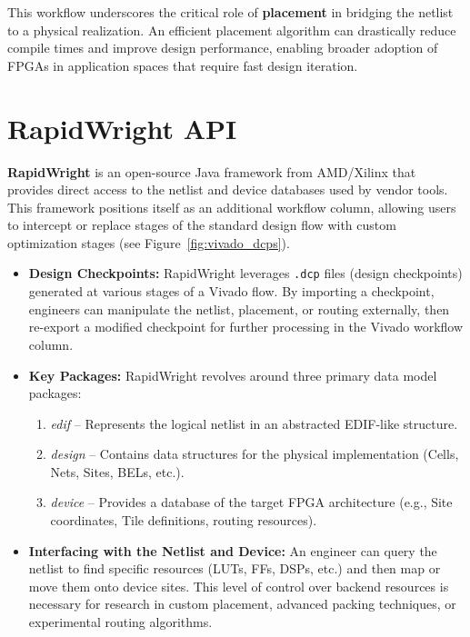 \documentclass{article}
\begin{document}
\begin{multicols}{2}
\begin{enumerate}
    \end{enumerate}

    This workflow underscores the critical role of \textbf{placement} in bridging the netlist to a physical realization. 
    An efficient placement algorithm can drastically reduce compile times and improve design performance, enabling broader adoption of FPGAs in application spaces that require fast design iteration.

\newpage
\section{RapidWright API}
    \label{sec:rapidwright_api}

    \textbf{RapidWright} is an open-source Java framework from AMD/Xilinx that provides direct access to the netlist and device databases used by vendor tools. 
    This framework positions itself as an additional workflow column, allowing users to intercept or replace stages of the standard design flow with custom optimization stages (see Figure~\ref{fig:vivado_dcps}).

    \begin{itemize}
    \item \textbf{Design Checkpoints:} 
        RapidWright leverages \texttt{.dcp} files (design checkpoints) generated at various stages of a Vivado flow. 
        By importing a checkpoint, engineers can manipulate the netlist, placement, or routing externally, then re-export a modified checkpoint for further processing in the Vivado workflow column.

    \item \textbf{Key Packages:} 
        RapidWright revolves around three primary data model packages:
        \begin{enumerate}
        \item \emph{edif} -- Represents the logical netlist in an abstracted EDIF-like structure.
        \item \emph{design} -- Contains data structures for the physical implementation (Cells, Nets, Sites, BELs, etc.).
        \item \emph{device} -- Provides a database of the target FPGA architecture (e.g., Site coordinates, Tile definitions, routing resources).
        \end{enumerate}

    \item \textbf{Interfacing with the Netlist and Device:} 
        An engineer can query the netlist to find specific resources (LUTs, FFs, DSPs, etc.) and then map or move them onto device sites. 
        This level of control over backend resources is necessary for research in custom placement, advanced packing techniques, or experimental routing algorithms.
    \end{itemize}


\end{multicols}
\end{document}
